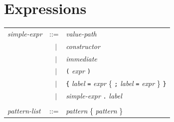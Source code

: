 \documentclass[11pt,titlepage,twoside]{report}
\newcommand{\alt}{\;|\;}
\newcommand{\Minusgreater}{\mbox{{\tt ->}}}
\newcommand{\Equalgreater}{\mbox{{\tt =>}}}
\newcommand{\term}[1]{{\tt #1}}
\newcommand{\nterm}[1]{{\em #1}}
\begin{document}
\section{Expressions\label{expressions}} %

\begin{center}
\begin{tabular}{lcl}
\nterm{simple-expr}
  & ::=        & \nterm{value-path} \\
  & $\;\;\alt$ & \nterm{constructor} \\
  & $\;\;\alt$ & \nterm{immediate} \\
  & $\;\;\alt$ & \term{(} \nterm{expr} \term{)} \\
  & $\;\;\alt$ & \term{\{} \nterm{label} \term{=} \nterm{expr}
                 \{ \term{;} \nterm{label} \term{=} \nterm{expr} \} 
                 \term{\}} \\
  & $\;\;\alt$ & \nterm{simple-expr} \term{.} \nterm{label}
\\ \\
\nterm{pattern-list}           
   & ::=        & \nterm{pattern} \{ \nterm{pattern} \}
\end{tabular}
\end{center}
\end{document}

